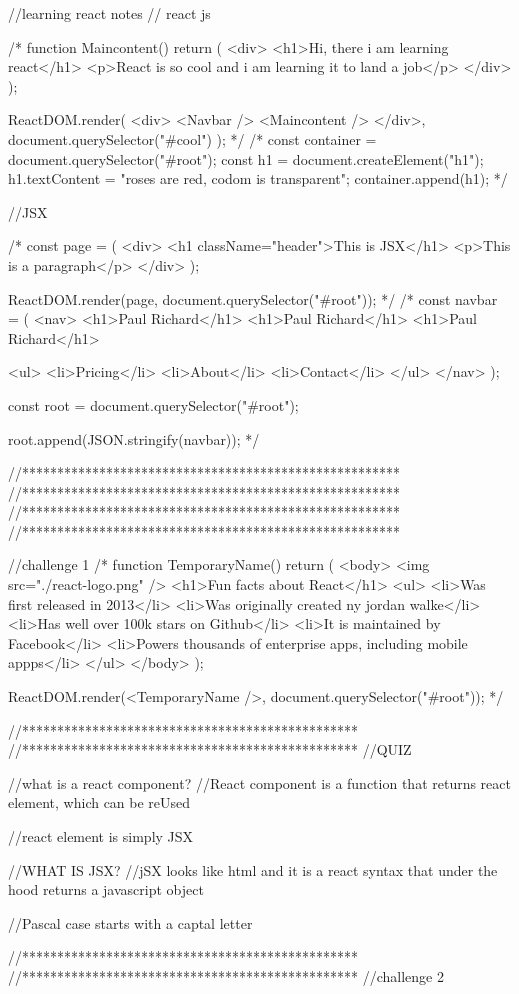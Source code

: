 //learning react notes
// react js

/* function Maincontent() {
  return (
    <div>
      <h1>Hi, there i am learning react</h1>
      <p>React is so cool and i am learning it to land a job</p>
    </div>
  );
}

ReactDOM.render(
  <div>
    <Navbar />
    <Maincontent />
  </div>,
  document.querySelector("#cool")
);
 */
/* 
const container = document.querySelector("#root");
const h1 = document.createElement("h1");
h1.textContent = "roses are red, codom is transparent";
container.append(h1); */

//JSX

/* const page = (
  <div>
    <h1 className="header">This is JSX</h1>
    <p>This is a paragraph</p>
  </div>
);

ReactDOM.render(page, document.querySelector("#root"));
 */
/* 
const navbar = (
  <nav>
    <h1>Paul Richard</h1>
    <h1>Paul Richard</h1>
    <h1>Paul Richard</h1>

    <ul>
      <li>Pricing</li>
      <li>About</li>
      <li>Contact</li>
    </ul>
  </nav>
);

const root = document.querySelector("#root");

root.append(JSON.stringify(navbar));
 */

//******************************************************
//******************************************************
//******************************************************
//******************************************************


//challenge 1
/* 
function TemporaryName() {
  return (
    <body>
      <img src="./react-logo.png" />
      <h1>Fun facts about React</h1>
      <ul>
        <li>Was first released in 2013</li>
        <li>Was originally created ny jordan walke</li>
        <li>Has well over 100k stars on Github</li>
        <li>It is maintained by Facebook</li>
        <li>Powers thousands of enterprise apps, including mobile appps</li>
      </ul>
    </body>
  );
}

ReactDOM.render(<TemporaryName />, document.querySelector("#root"));
 */

//************************************************
//************************************************
//QUIZ

//what is a react component?
//React component is a function that returns react element, which can be reUsed

//react element is simply JSX

//WHAT IS JSX?
//jSX looks like html and it is a react syntax that under the hood returns a javascript object

//Pascal case starts with a captal letter

//************************************************
//************************************************
//challenge 2
